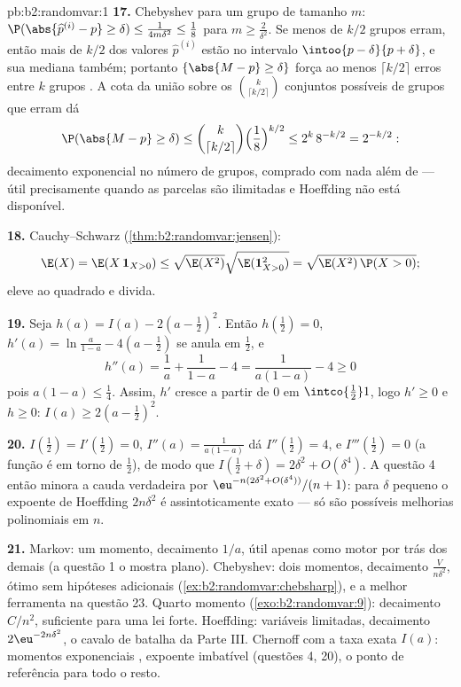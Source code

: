 \begin{solution}{pb:b2:randomvar:1}
\textbf{17.} Chebyshev para um grupo de tamanho $m$: $\P(\abs{
\widehat p^{(i)} - p} \geq \delta) \leq \frac{1}{4m\delta^2}
\leq \frac18$ para $m \geq \frac2{\delta^2}$. Se menos de
$k/2$ grupos erram, então mais de $k/2$ dos valores
$\widehat p^{(i)}$ estão no intervalo  $\intoo{p -
\delta}{p + \delta}$, e sua mediana também; portanto
$\{\abs{M - p} \geq \delta\}$ força ao menos $\lceil
k/2\rceil$ erros entre $k$ grupos . A cota da
união sobre os $\binom k{\lceil k/2\rceil}$ conjuntos possíveis de
grupos que erram dá
\[
\P(\abs{M - p} \geq \delta)
\leq \binom{k}{\lceil k/2\rceil}
\Bigl(\frac18\Bigr)^{k/2}
\leq 2^k\,8^{-k/2} = 2^{-k/2} :
\]
decaimento exponencial no número de grupos, comprado com
nada além de  --- útil precisamente quando as parcelas
são ilimitadas e Hoeffding não está disponível.

\textbf{18.} Cauchy--Schwarz
(\cref{thm:b2:randomvar:jensen}):
\[
\E(X) = \E(X\,\mathbf 1_{X>0})
\leq \sqrt{\E(X^2)}\sqrt{\E(\mathbf 1_{X>0}^2)}
= \sqrt{\E(X^2)\,\P(X > 0)} ;
\]
eleve ao quadrado e divida.

\textbf{19.} Seja $h(a) = I(a) - 2(a - \tfrac12)^2$. Então
$h(\tfrac12) = 0$, $h'(a) = \ln\frac a{1-a} - 4(a -
\tfrac12)$ se anula em $\tfrac12$, e
\[
h''(a) = \frac1a + \frac1{1-a} - 4 = \frac{1}{a(1-a)} - 4
\geq 0
\]
pois $a(1-a) \leq \frac14$. Assim, $h'$ cresce a partir de $0$ em
$\intco{\frac12}1$, logo $h' \geq 0$ e $h \geq 0$: $I(a)
\geq 2(a - \tfrac12)^2$.

\textbf{20.} $I(\tfrac12) = I'(\tfrac12) = 0$, $I''(a) =
\frac1{a(1-a)}$ dá $I''(\tfrac12) = 4$, e $I'''(\tfrac12)
= 0$ (a função é  em torno de $\tfrac12$), de modo que
$I(\tfrac12 + \delta) = 2\delta^2 + O(\delta^4)$. A questão 4
então minora a cauda verdadeira por
$\eu^{-n(2\delta^2 + O(\delta^4))}/(n+1)$: para $\delta$ pequeno
o expoente de Hoeffding $2n\delta^2$ é assintoticamente exato
--- só são possíveis melhorias polinomiais em $n$.

\textbf{21.} Markov: um momento, decaimento $1/a$, útil apenas como
motor por trás dos demais (a questão 1 o mostra plano).
Chebyshev: dois momentos, decaimento $\frac{V}{n\delta^2}$, ótimo
sem hipóteses adicionais
(\cref{ex:b2:randomvar:chebsharp}), e a melhor ferramenta na
questão 23. Quarto momento (\cref{exo:b2:randomvar:9}):
decaimento $C/n^2$,  suficiente para uma lei forte.
Hoeffding: variáveis limitadas, decaimento $2\eu^{-2n\delta^2}$,
o cavalo de batalha da Parte III. Chernoff com a taxa exata
$I(a)$: momentos exponenciais , expoente imbatível
(questões 4, 20), o ponto de referência para todo o resto.


\end{solution}
